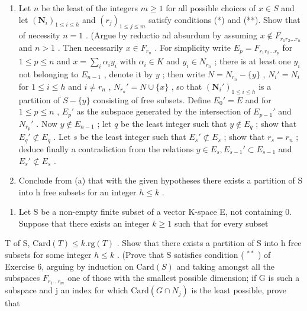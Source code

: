 \begin{enumerate}
\def\labelenumi{(\alph{enumi})}
\item
  Let \(n\) be the least of the integers \(m \geqslant 1\) for all possible choices of \(x \in S\) and let \((\mathbf{N}_i)_{1 \leqslant i \leqslant h}\) and \((r_j)_{1 \leqslant j \leqslant m}\) satisfy conditions (*) and (**). Show that of necessity \(n = 1\) . (Argue by reductio ad absurdum by assuming \(x \notin F_{r_1 r_2 \ldots r_n}\) and \(n > 1\) . Then necessarily \(x \in F_{r_n}\) . For simplicity write \(E_p = F_{r_1 r_2 \ldots r_p}\) for \(1 \leqslant p \leqslant n\) and \(x = \sum_i \alpha_i y_i\) with \(\alpha_i \in K\) and \(y_i \in N_{r_n}\) ; there is at least one \(y_i\) not belonging to \(E_{n-1}\) , denote it by \(y\) ; then write \(N = N_{r_n} - \{y\}\) , \(N_i' = N_i\) for \(1 \leqslant i \leqslant h\) and \(i \neq r_n\) , \(N_{r_n}' = N \cup \{x\}\) , so that \((\mathbf{N}_i')_{1 \leqslant i \leqslant h}\) is a partition of \(S - \{y\}\) consisting of free subsets. Define \(E_0' = E\) and for \(1 \leqslant p \leqslant n\) , \(E_p'\) as the subspace generated by the intersection of \(E_{p-1}'\) and \(N_{r_p}'\) . Now \(y \notin E_{n-1}\) ; let \(q\) be the least integer such that \(y \notin E_q\) ; show that \(E_q' \not\subset E_q\) . Let \(s\) be the least integer such that \(E_s' \not\subset E_s\) ; show that \(r_s = r_n\) ; deduce finally a contradiction from the relations \(y \in E_s, E_{s-1}' \subset E_{s-1}\) and \(E_s' \not\subset E_s\) .
\item
  Conclude from (a) that with the given hypotheses there exists a partition of S into h free subsets for an integer \(h \leqslant k\) .
\end{enumerate}

\begin{enumerate}
\def\labelenumi{\arabic{enumi}.}
\setcounter{enumi}{6}
\tightlist
\item
  Let S be a non-empty finite subset of a vector K-space E, not containing 0. Suppose that there exists an integer \(k \geqslant 1\) such that for every subset
\end{enumerate}

T of S, \(\text{Card}(T) \leqslant k.\text{rg}(T)\) . Show that there exists a partition of S into h free subsets for some integer \(h \leqslant k\) . (Prove that S satisfies condition ( \(^{**}\) ) of Exercise 6, arguing by induction on \(\text{Card}(S)\) and taking amongst all the subspaces \(F_{r_{1}\ldots r_{m}}\) one of those with the smallest possible dimension; if G is such a subspace and j an index for which \(\text{Card}(G \cap N_{j})\) is the least possible, prove that

